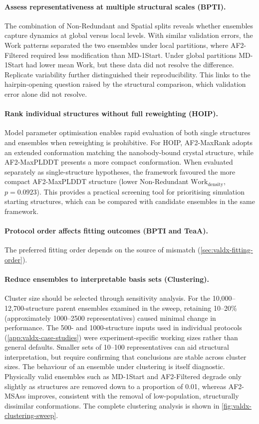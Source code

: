 \paragraph{Assess representativeness at multiple structural scales (BPTI).}
The combination of Non-Redundant and Spatial splits reveals whether ensembles capture dynamics at global versus local levels. With similar validation errors, the Work patterns separated the two ensembles under local partitions, where AF2-Filtered required less modification than MD-1Start. Under global partitions MD-1Start had lower mean Work, but these data did not resolve the difference. Replicate variability further distinguished their reproducibility. This links to the hairpin-opening question raised by the structural comparison, which validation error alone did not resolve.

\paragraph{Rank individual structures without full reweighting (HOIP).}
Model parameter optimisation enables rapid evaluation of both single structures and ensembles when reweighting is prohibitive. For HOIP, AF2-MaxRank adopts an extended conformation matching the nanobody-bound crystal structure, while AF2-MaxPLDDT presents a more compact conformation. When evaluated separately as single-structure hypotheses, the framework favoured the more compact AF2-MaxPLDDT structure (lower Non-Redundant $\text{Work}_\text{density}$, $p=0.0923$). This provides a practical screening tool for prioritising simulation starting structures, which can be compared with candidate ensembles in the same framework.

\paragraph{Protocol order affects fitting outcomes (BPTI and TeaA).}
The preferred fitting order depends on the source of mismatch (\cref{sec:valdx-fitting-order}).

\paragraph{Reduce ensembles to interpretable basis sets (Clustering).}
Cluster size should be selected through sensitivity analysis. For the 10,000--12,700-structure parent ensembles examined in the sweep, retaining 10--20\% (approximately 1000--2500 representatives) caused minimal change in performance. The 500- and 1000-structure inputs used in individual protocols (\cref{app:valdx-case-studies}) were experiment-specific working sizes rather than general defaults. Smaller sets of 10--100 representatives can aid structural interpretation, but require confirming that conclusions are stable across cluster sizes. The behaviour of an ensemble under clustering is itself diagnostic. Physically valid ensembles such as MD-1Start and AF2-Filtered degrade only slightly as structures are removed down to a proportion of 0.01, whereas AF2-MSAss improves, consistent with the removal of low-population, structurally dissimilar conformations. The complete clustering analysis is shown in \cref{fig:valdx-clustering-sweep}.

